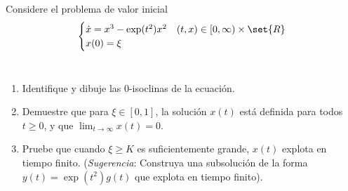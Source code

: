 \documentclass{homework}
\begin{document}
\begin{prob}
    Considere el problema de valor inicial
    \[\begin{cases}
            \dot{x}=x^3-\exp(t^2)x^2 & (t,x)\in[0,\infty)\times\set{R} \\
            x(0)=\xi
        \end{cases}\]\
    \begin{enumerate}
        \item Identifique y dibuje las 0-isoclinas de la ecuación.
        \item Demuestre que para \(\xi\in[0,1]\), la solución \(x(t)\) está definida para todos \(t\geq0\), y que \(\lim_{t\rightarrow\infty}x(t)=0\).
        \item Pruebe que cuando \(\xi\geq K\) es suficientemente grande, \(x(t)\) explota en tiempo finito. (\textit{Sugerencia}: Construya una subsolución de la forma \(y(t)=\exp(t^2)g(t)\) que explota en tiempo finito).
    \end{enumerate}
\end{prob}
\end{document}
